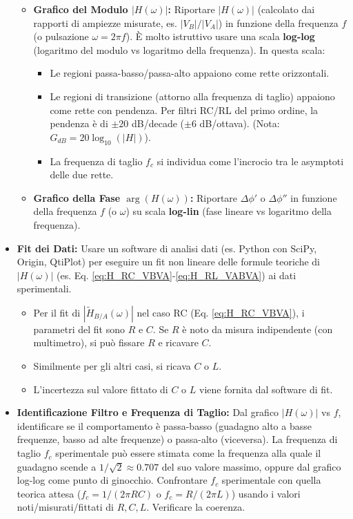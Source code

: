 \documentclass[a4paper, 11pt]{article}
\newcommand{\abs}[1]{\left|#1\right|}
\newcommand{\argum}[1]{\arg\left(#1\right)}
\begin{document}
\begin{itemize}
\begin{itemize}
            \item \textbf{Grafico del Modulo $\abs{H(\omega)}$:} Riportare $\abs{H(\omega)}$ (calcolato dai rapporti di ampiezze misurate, es. $\abs{V_B}/\abs{V_A}$) in funzione della frequenza $f$ (o pulsazione $\omega = 2\pi f$). È molto istruttivo usare una scala \textbf{log-log} (logaritmo del modulo vs logaritmo della frequenza). In questa scala:
                \begin{itemize}
                    \item Le regioni passa-basso/passa-alto appaiono come rette orizzontali.
                    \item Le regioni di transizione (attorno alla frequenza di taglio) appaiono come rette con pendenza. Per filtri RC/RL del primo ordine, la pendenza è di $\pm 20$ dB/decade ($\pm 6$ dB/ottava). (Nota: $G_{dB} = 20 \log_{10}(\abs{H})$).
                    \item La frequenza di taglio $f_c$ si individua come l'incrocio tra le asymptoti delle due rette.
                \end{itemize}
            \item \textbf{Grafico della Fase $\argum{H(\omega)}$:} Riportare $\Delta\phi'$ o $\Delta\phi''$ in funzione della frequenza $f$ (o $\omega$) su scala \textbf{log-lin} (fase lineare vs logaritmo della frequenza).
        \end{itemize}
    \item \textbf{Fit dei Dati:} Usare un software di analisi dati (es. Python con SciPy, Origin, QtiPlot) per eseguire un fit non lineare delle formule teoriche di $\abs{H(\omega)}$ (es. Eq. \ref{eq:H_RC_VBVA}-\ref{eq:H_RL_VABVA}) ai dati sperimentali.
        \begin{itemize}
            \item Per il fit di $\abs{\tilde{H}_{B/A}(\omega)}$ nel caso RC (Eq. \ref{eq:H_RC_VBVA}), i parametri del fit sono $R$ e $C$. Se $R$ è noto da misura indipendente (con multimetro), si può fissare $R$ e ricavare $C$.
            \item Similmente per gli altri casi, si ricava $C$ o $L$.
            \item L'incertezza sul valore fittato di $C$ o $L$ viene fornita dal software di fit.
        \end{itemize}
    \item \textbf{Identificazione Filtro e Frequenza di Taglio:} Dal grafico $\abs{H(\omega)}$ vs $f$, identificare se il comportamento è passa-basso (guadagno alto a basse frequenze, basso ad alte frequenze) o passa-alto (viceversa). La frequenza di taglio $f_c$ sperimentale può essere stimata come la frequenza alla quale il guadagno scende a $1/\sqrt{2} \approx 0.707$ del suo valore massimo, oppure dal grafico log-log come punto di ginocchio. Confrontare $f_c$ sperimentale con quella teorica attesa ($f_c = 1/(2\pi RC)$ o $f_c = R/(2\pi L)$) usando i valori noti/misurati/fittati di $R, C, L$. Verificare la coerenza.
\end{itemize}
\end{document}
